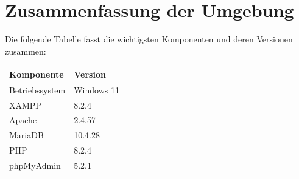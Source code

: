 \section{Zusammenfassung der Umgebung}

Die folgende Tabelle fasst die wichtigsten Komponenten und deren Versionen zusammen:

\begin{center}
    \begin{tabular}{|l|l|}
        \hline
        \textbf{Komponente} & \textbf{Version} \\
        \hline
        Betriebssystem & Windows 11 \\
        \acs{XAMPP} & 8.2.4 \\
        Apache & 2.4.57 \\
        Maria\acs{DB} & 10.4.28 \\
        \acs{PHP} & 8.2.4 \\
        phpMyAdmin & 5.2.1 \\
        \hline
    \end{tabular}
\end{center}

